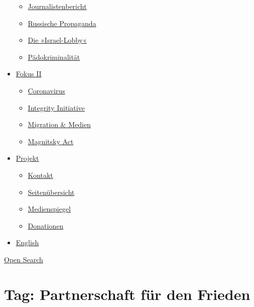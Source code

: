 \begin{itemize}
  \begin{itemize}
  \tightlist
  \item
    \href{https://swprs.org/bericht-eines-journalisten/}{Journalistenbericht}
  \item
    \href{https://swprs.org/russische-propaganda/}{Russische Propaganda}
  \item
    \href{https://swprs.org/die-israel-lobby-fakten-und-mythen/}{Die
    »Israel-Lobby«}
  \item
    \href{https://swprs.org/geopolitik-und-paedokriminalitaet/}{Pädokriminalität}
  \end{itemize}
\item
  \href{https://swprs.org/migration-und-medien/}{Fokus II}

  \begin{itemize}
  \tightlist
  \item
    \href{https://swprs.org/covid-19-hinweis-ii/}{Coronavirus}
  \item
    \href{https://swprs.org/die-integrity-initiative/}{Integrity
    Initiative}
  \item
    \href{https://swprs.org/migration-und-medien/}{Migration \& Medien}
  \item
    \href{https://swprs.org/der-fall-magnitsky/}{Magnitsky Act}
  \end{itemize}
\item
  \href{https://swprs.org/kontakt/}{Projekt}

  \begin{itemize}
  \tightlist
  \item
    \href{https://swprs.org/kontakt/}{Kontakt}
  \item
    \href{https://swprs.org/uebersicht/}{Seitenübersicht}
  \item
    \href{https://swprs.org/medienspiegel/}{Medienspiegel}
  \item
    \href{https://swprs.org/donationen/}{Donationen}
  \end{itemize}
\item
  \href{https://swprs.org/contact/}{English}
\end{itemize}

\protect\hyperlink{}{Open Search}

\hypertarget{tag-partnerschaft-fuxfcr-den-frieden}{%
\section{Tag: Partnerschaft für den
Frieden}\label{tag-partnerschaft-fuxfcr-den-frieden}}

